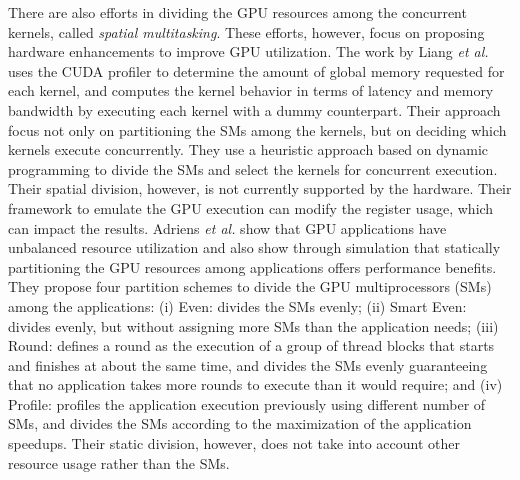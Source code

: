 \documentclass[conference]{IEEEtran}
\begin{document}
There are also efforts in dividing the GPU resources among the concurrent kernels, called \textit{spatial multitasking}. These efforts, however, focus on proposing hardware enhancements to improve GPU utilization. The work by Liang \textit{et al.} \cite{liang2015efficient} uses the CUDA profiler to determine the amount of global memory requested for each kernel, and computes the kernel behavior in terms of latency and memory bandwidth by executing each kernel with a dummy counterpart. Their approach focus not only on partitioning the SMs among the kernels, but on deciding which kernels execute concurrently. They use a heuristic approach based on dynamic programming to divide the SMs and select the kernels for concurrent execution. Their spatial division, however, is not currently supported by the hardware. Their framework to emulate the GPU execution can modify the register usage, which can impact the results. Adriens \textit{et al.} \cite{adriaens2012case} show that GPU applications have unbalanced resource utilization and also show through simulation that statically partitioning the GPU resources among applications offers performance benefits. They propose four partition schemes to divide the GPU multiprocessors (SMs) among the applications: (i) Even: divides the SMs evenly; (ii) Smart Even: divides evenly, but without assigning more SMs than the application needs; (iii) Round:  defines a round as the execution of a group of thread blocks that starts and finishes at about the same time, and divides the SMs evenly guaranteeing that no application takes more rounds to execute than it would require; and (iv) Profile: profiles the application execution previously using different number of SMs, and divides the SMs according to the maximization of the application speedups. Their static division, however, does not take into account other resource usage rather than the SMs.
\end{document}
